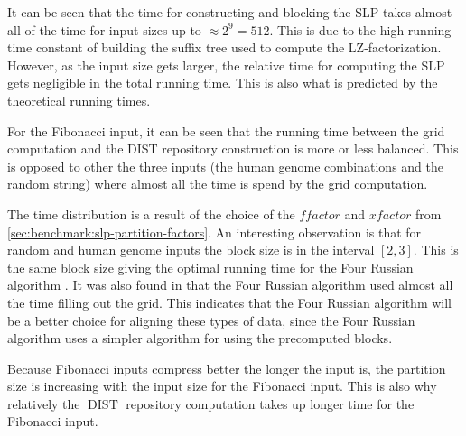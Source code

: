\documentclass[twoside,11pt,openright]{report}
\newcommand{\DIST}{\operatorname{DIST}}
\newcommand{\xfactor}{\ensuremath{\mathit{xfactor}}}
\newcommand{\ffactor}{\ensuremath{\mathit{ffactor}}}
\begin{document}
It can be seen that the time for constructing and blocking the SLP takes almost all of the time for input sizes up to $\approx 2^9 = 512$. This is due to the high running time constant of building the suffix tree used to compute the LZ-factorization. However, as the input size gets larger, the relative time for computing the SLP gets negligible in the total running time. This is also what is predicted by the theoretical running times.

For the Fibonacci input, it can be seen that the running time between the grid computation and the DIST repository construction is more or less balanced. This is opposed to other the three inputs (the human genome combinations and the random string) where almost all the time is spend by the grid computation.

The time distribution is a result of the choice of the $\ffactor$ and $\xfactor$ from \cref{sec:benchmark:slp-partition-factors}. An interesting observation is that for random and human genome inputs the block size is in the interval $[2, 3]$. This is the same block size giving the optimal running time for the Four Russian algorithm \cite{LasseFourRussian}. It was also found in \cite{LasseFourRussian} that the Four Russian algorithm used almost all the time filling out the grid. This indicates that the Four Russian algorithm will be a better choice for aligning these types of data, since the Four Russian algorithm uses a simpler algorithm for using the precomputed blocks.

Because Fibonacci inputs compress better the longer the input is, the partition size is increasing with the input size for the Fibonacci input. This is also why relatively the $\DIST$ repository computation takes up longer time for the Fibonacci input.
\end{document}
